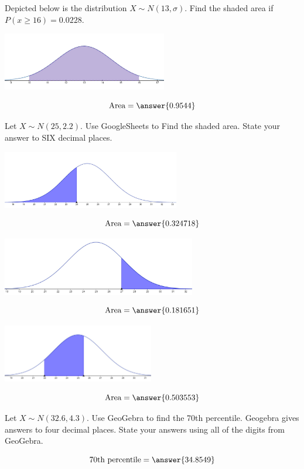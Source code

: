 \documentclass{ximera}
\begin{document}
\begin{problem}\label{prob:140hom5prob5}
Depicted below is the distribution $X\sim N(13, \sigma)$.  Find the shaded area if $P(x\geq 16)=0.0228$.
\begin{image}
   \includegraphics[height=1in]{140H5pic4.jpg}
 \end{image}
 $$\mbox{Area}=\answer{0.9544}$$
\end{problem}

\begin{problem}\label{prob:140hom5prob3}
Let $X\sim N(25, 2.2)$.  Use GoogleSheets to Find the shaded area.  State your answer to SIX decimal places.
\begin{image}
   \includegraphics[height=1in]{140H5pic1.jpg}
 \end{image}
 $$\mbox{Area}=\answer{0.324718}$$
 \begin{image}
   \includegraphics[height=1in]{140H5pic2.jpg}
 \end{image}
 $$\mbox{Area}=\answer{0.181651}$$
 \begin{image}
   \includegraphics[height=1in]{140H5pic3.jpg}
 \end{image}
 $$\mbox{Area}=\answer{0.503553}$$
\end{problem}

\begin{problem}\label{prob:140hom5prob4} Let $X\sim N(32.6, 4.3)$.  Use GeoGebra to find the 70th percentile.  Geogebra gives answers to four decimal places.  State your answers using all of the digits from GeoGebra.
\begin{center}  
\end{center}
$$70\mbox{th percentile}=\answer{34.8549}$$
\end{problem}
\end{document}
